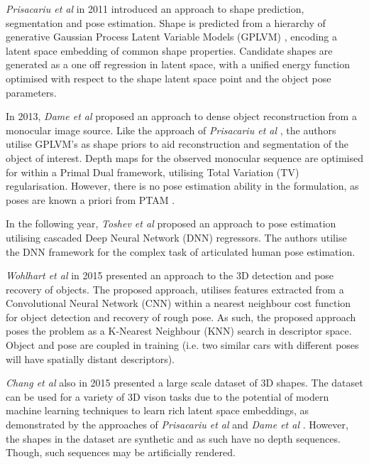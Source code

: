 {\textit{Prisacariu et al} \cite{Prisacariu2011} in 2011 introduced an approach to shape prediction, 
segmentation and pose estimation. Shape is predicted from a hierarchy of generative Gaussian Process 
Latent Variable Models (GPLVM) \cite{Lawrence2005}, encoding a latent space embedding of common shape 
properties. Candidate shapes are generated as a one off regression in latent space, with a unified 
energy function optimised with respect to the shape latent space point and the object pose parameters.

In 2013, \textit{Dame et al} \cite{Dame2013} proposed an approach to dense object reconstruction from a 
monocular image source. Like the approach of \textit{Prisacariu et al} \cite{Prisacariu2011}, the authors 
utilise GPLVM's as shape priors to aid reconstruction and segmentation of the object of interest. Depth maps 
for the observed monocular sequence are optimised for within a Primal Dual framework, utilising 
Total Variation (TV) \cite{Rudin1992} regularisation. However, there is no pose estimation 
ability in the formulation, as poses are known a priori from PTAM \cite{Klein2007}.

In the following year, \textit{Toshev et al} \cite{Toshev2014} proposed an approach to pose estimation 
utilising cascaded Deep Neural Network (DNN) \cite{LeCun2015} regressors. The authors utilise the DNN 
framework for the complex task of articulated human pose estimation.

\textit{Wohlhart et al} \cite{Wohlhart2015} in 2015 presented an approach to the 3D detection and pose 
recovery of objects. The proposed approach, utilises features extracted from a Convolutional Neural 
Network (CNN) \cite{LeCun2015} within a nearest neighbour cost function for object detection and recovery 
of rough pose. As such, the proposed approach poses the problem as a K-Nearest Neighbour (KNN) 
\cite{Altman1992} search in descriptor space. Object and pose are coupled in training (i.e. two similar 
cars with different poses will have spatially distant descriptors).

\textit{Chang et al} \cite{Chang2015} also in 2015 presented a large scale dataset of 3D shapes. The 
dataset can be used for a variety of 3D vison tasks due to the potential of modern machine learning 
techniques to learn rich latent space embeddings, as demonstrated by the approaches of 
\textit{Prisacariu et al} \cite{Prisacariu2011} and \textit{Dame et al} \cite{Dame2013}. However, the 
shapes in the dataset are synthetic and as such have no depth sequences. Though, such sequences may be 
artificially rendered.

}
